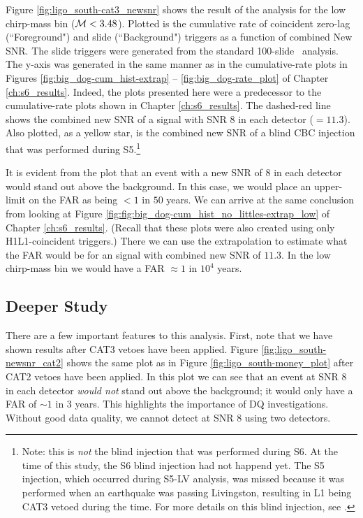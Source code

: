 Figure \ref{fig:ligo_south-cat3_newsnr} shows the result of the analysis for
the low chirp-mass bin ($\mathcal{M} < 3.48$). Plotted is the cumulative rate of
coincident zero-lag (``Foreground") and slide (``Background") triggers as a
function of combined New \ac{SNR}. The slide triggers were generated from the
standard 100-slide \ihope~analysis. The y-axis was generated in the same manner
as in the cumulative-rate plots in Figures \ref{fig:big_dog-cum_hist-extrap} --
\ref{fig:big_dog-rate_plot} of Chapter \ref{ch:s6_results}. Indeed, the plots
presented here were a predecessor to the cumulative-rate plots shown in Chapter
\ref{ch:s6_results}. The dashed-red line shows the combined new \ac{SNR} of a
signal with \ac{SNR} $8$ in each detector ($= 11.3$). Also plotted, as a yellow
star, is the combined new \ac{SNR} of a blind \ac{CBC} injection that was
performed during \ac{S5}.\footnote{Note: this is \emph{not} the blind injection
that was performed during \ac{S6}. At the time of this study, the \ac{S6} blind
injection had not happend yet. The \ac{S5} injection, which occurred during
\ac{S5}-LV analysis, was missed because it was performed when an earthquake was
passing Livingston, resulting in L1 being CAT3 vetoed during the time. For more
details on this blind injection, see \cite{S5LowMassLV}.}

It is evident from the plot that an event with a new \ac{SNR} of $8$ in each
detector would stand out above the background. In this case, we would place an
upper-limit on the \ac{FAR} as being $< 1$ in $50$ years. We can arrive at the
same conclusion from looking at Figure
\ref{fig:fig:big_dog-cum_hist_no_littles-extrap_low} of Chapter
\ref{ch:s6_results}. (Recall that these plots were also created using only
H1L1-coincident triggers.) There we can use the extrapolation to estimate what
the \ac{FAR} would be for an signal with combined new \ac{SNR} of $11.3$. In
the low chirp-mass bin we would have a \ac{FAR} $\approx 1$ in $10^4$ years. 

\subsection{Deeper Study}

There are a few important features to this analysis. First, note that we have
shown results after CAT3 vetoes have been applied. Figure
\ref{fig:ligo_south-newsnr_cat2} shows the same plot as in Figure
\ref{fig:ligo_south-money_plot} after CAT2 vetoes have been applied. In this
plot we can see that an event at \ac{SNR} $8$ in each detector \emph{would not}
stand out above the background; it would only have a \ac{FAR} of $\sim1$ in $3$
years. This highlights the importance of \ac{DQ} investigations. Without good
data quality, we cannot detect at \ac{SNR} $8$ using two detectors.

